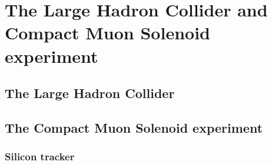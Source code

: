 \chapter{The Large Hadron Collider and Compact Muon Solenoid experiment}
\label{lhc_and_cms}

\section{The Large Hadron Collider}

\section{The Compact Muon Solenoid experiment}

\subsection{Silicon tracker}
\label{tracker}

